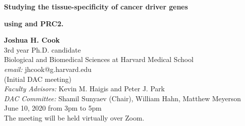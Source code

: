 \begin{titlepage}
    \begin{center}
        \vspace*{2cm}
        \LARGE
        \vspace{3cm}
        \textbf{Studying the tissue-specificity of cancer driver genes}
        
        \textbf{using \KRAS{} and PRC2.}

        \vspace{3cm}
 
        \Large
        \textbf{Joshua H. Cook} \\
        \vspace{2cm}
        3rd year Ph.D. candidate \\
        Biological and Biomedical Sciences at Harvard Medical School \\
        \emph{email:} jhcook@g.harvard.edu \\
        (Initial DAC meeting) \\
        \emph{Faculty Advisors:} Kevin M. Haigis and Peter J. Park \\
        \emph{DAC Committee:} Shamil Sunyaev (Chair), William Hahn, Matthew Meyerson \\
        June 10, 2020 from 3pm to 5pm \\
        The meeting will be held virtually over Zoom.\\
        \vspace{2cm}
 
    \end{center}
\end{titlepage}
